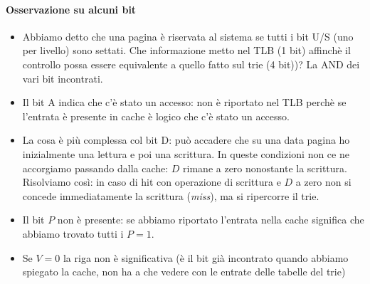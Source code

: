 \documentclass[11pt]{report}
\theoremstyle{definition}
\begin{document}
\paragraph{Osservazione su alcuni bit} 
\begin{itemize}
	\item Abbiamo detto che una pagina è riservata al sistema se tutti i bit U/S (uno per livello) sono settati. Che informazione metto nel TLB (1 bit) affinchè il controllo possa essere equivalente a quello fatto sul trie (4 bit))?
	La AND dei vari bit incontrati.
	\item Il bit A indica che c'è stato un accesso: non è riportato nel TLB perchè se l'entrata è presente in cache è logico che c'è stato un accesso.
	\item La cosa è più complessa col bit D: può accadere che su una data pagina ho inizialmente una lettura e poi una scrittura. In queste condizioni non ce ne accorgiamo passando dalla cache: $D$ rimane a zero nonostante la scrittura. {Risolviamo così: in caso di hit con operazione di scrittura e $D$ a zero non si concede immediatamente la scrittura (\emph{miss}), ma si ripercorre il trie}.   
	\item Il bit $P$ non è presente: se abbiamo riportato l'entrata nella cache significa che abbiamo trovato tutti i $P=1$.
	\item Se $V=0$ la riga non è significativa (è il bit già incontrato quando abbiamo spiegato la cache, non ha a che vedere con le entrate delle tabelle del trie)
\end{itemize}
\end{document}
